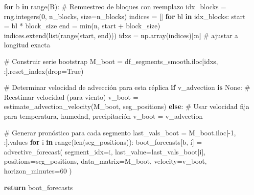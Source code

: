 \documentclass[
  spanish,
  us-letterpaper,
]{scrreprt}
\newenvironment{Shaded}{\begin{snugshade}}{\end{snugshade}}
\newcommand{\BuiltInTok}[1]{\textcolor[rgb]{0.00,0.23,0.31}{#1}}
\newcommand{\CommentTok}[1]{\textcolor[rgb]{0.37,0.37,0.37}{#1}}
\newcommand{\ControlFlowTok}[1]{\textcolor[rgb]{0.00,0.23,0.31}{\textbf{#1}}}
\newcommand{\DecValTok}[1]{\textcolor[rgb]{0.68,0.00,0.00}{#1}}
\newcommand{\KeywordTok}[1]{\textcolor[rgb]{0.00,0.23,0.31}{\textbf{#1}}}
\newcommand{\NormalTok}[1]{\textcolor[rgb]{0.00,0.23,0.31}{#1}}
\newcommand{\OperatorTok}[1]{\textcolor[rgb]{0.37,0.37,0.37}{#1}}
\newcommand{\VariableTok}[1]{\textcolor[rgb]{0.07,0.07,0.07}{#1}}
\numberwithin{equation}{section}
\begin{document}
\begin{Shaded}
\begin{Highlighting}[]
    \ControlFlowTok{for}\NormalTok{ b }\KeywordTok{in} \BuiltInTok{range}\NormalTok{(B):}
        \CommentTok{\# Remuestreo de bloques con reemplazo}
\NormalTok{        idx\_blocks }\OperatorTok{=}\NormalTok{ rng.integers(}\DecValTok{0}\NormalTok{, n\_blocks, size}\OperatorTok{=}\NormalTok{n\_blocks)}
\NormalTok{        indices }\OperatorTok{=}\NormalTok{ []}
        \ControlFlowTok{for}\NormalTok{ bl }\KeywordTok{in}\NormalTok{ idx\_blocks:}
\NormalTok{            start }\OperatorTok{=}\NormalTok{ bl }\OperatorTok{*}\NormalTok{ block\_size}
\NormalTok{            end }\OperatorTok{=} \BuiltInTok{min}\NormalTok{(n, start }\OperatorTok{+}\NormalTok{ block\_size)}
\NormalTok{            indices.extend(}\BuiltInTok{list}\NormalTok{(}\BuiltInTok{range}\NormalTok{(start, end)))}
\NormalTok{        idxs }\OperatorTok{=}\NormalTok{ np.array(indices)[:n]  }\CommentTok{\# ajustar a longitud exacta}
        
        \CommentTok{\# Construir serie bootstrap}
\NormalTok{        M\_boot }\OperatorTok{=}\NormalTok{ df\_segments\_smooth.iloc[idxs, :].reset\_index(drop}\OperatorTok{=}\VariableTok{True}\NormalTok{)}
        
        \CommentTok{\# Determinar velocidad de advección para esta réplica}
        \ControlFlowTok{if}\NormalTok{ v\_advection }\KeywordTok{is} \VariableTok{None}\NormalTok{:}
            \CommentTok{\# Reestimar velocidad (para viento)}
\NormalTok{            v\_boot }\OperatorTok{=}\NormalTok{ estimate\_advection\_velocity(M\_boot, seg\_positions)}
        \ControlFlowTok{else}\NormalTok{:}
            \CommentTok{\# Usar velocidad fija para temperatura, humedad, precipitación}
\NormalTok{            v\_boot }\OperatorTok{=}\NormalTok{ v\_advection}
        
        \CommentTok{\# Generar pronóstico para cada segmento}
\NormalTok{        last\_vals\_boot }\OperatorTok{=}\NormalTok{ M\_boot.iloc[}\OperatorTok{{-}}\DecValTok{1}\NormalTok{, :].values}
        \ControlFlowTok{for}\NormalTok{ i }\KeywordTok{in} \BuiltInTok{range}\NormalTok{(}\BuiltInTok{len}\NormalTok{(seg\_positions)):}
\NormalTok{            boot\_forecasts[b, i] }\OperatorTok{=}\NormalTok{ advective\_forecast(}
\NormalTok{                segment\_idx}\OperatorTok{=}\NormalTok{i,}
\NormalTok{                last\_value}\OperatorTok{=}\NormalTok{last\_vals\_boot[i],}
\NormalTok{                positions}\OperatorTok{=}\NormalTok{seg\_positions,}
\NormalTok{                data\_matrix}\OperatorTok{=}\NormalTok{M\_boot,}
\NormalTok{                velocity}\OperatorTok{=}\NormalTok{v\_boot,}
\NormalTok{                horizon\_minutes}\OperatorTok{=}\DecValTok{60}
\NormalTok{            )}
    
    \ControlFlowTok{return}\NormalTok{ boot\_forecasts}
\end{Highlighting}
\end{Shaded}
\end{document}

